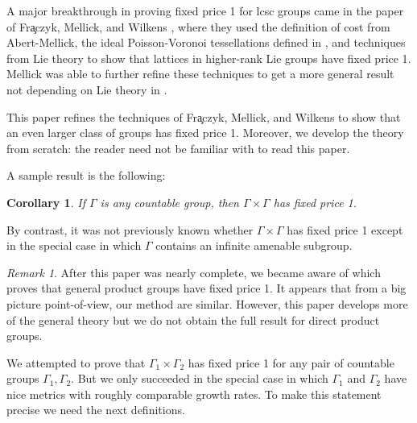 \documentclass[12pt]{article}
\theoremstyle{plain}
\newtheorem{cor}[thm]{Corollary}
\theoremstyle{definition}
\theoremstyle{remark}
\newtheorem{remark}{Remark}
\newcommand{\G}{\Gamma}
\begin{document}


A major breakthrough in proving fixed price 1 for lcsc groups came in the paper of Fr\c aczyk, Mellick, and Wilkens \cite{fraczyk2023poissonvoronoitessellationsfixedprice}, where they used the definition of cost from Abert-Mellick, the ideal Poisson-Voronoi tessellations defined in \cite{dachille2025idealpoissonvoronoitessellationshyperbolic}, and techniques from Lie theory to show that lattices in higher-rank Lie groups have fixed price 1. 
Mellick was able to further refine these techniques to get a more general result not depending on Lie theory in \cite{mellick2023gaboriauscriterionfixedprice}.

This paper refines the techniques of Fr\c aczyk, Mellick, and Wilkens to show that an even larger class of groups has fixed price 1. Moreover, we develop the theory from scratch: the reader need not be familiar with \cite{fraczyk2023poissonvoronoitessellationsfixedprice} to read this paper. 

A sample result is the following:
\begin{cor}\label{C:self}
    If $\G$ is any countable group, then $\G \times \G$ has fixed price 1.
\end{cor}
By contrast, it was not previously known whether $\G\times \G$ has fixed price 1 except in the special case in which $\G$ contains an infinite amenable subgroup.

\begin{remark}
    After this paper was nearly complete, we became aware of \cite{khezeli2025productsinfinitecountablegroups} which proves that general product groups have fixed price 1. It appears that from a big picture point-of-view, our method are similar. However, this paper develops more of the general theory but we do not obtain the full result for direct product groups. 
\end{remark}

We attempted to prove that $\G_1\times \G_2$ has fixed price 1 for any pair of countable groups $\G_1,\G_2$. But we only succeeded in the special case in which $\G_1$ and $\G_2$ have nice metrics with roughly comparable growth rates. To make this statement precise we need the next definitions.
\end{document}

